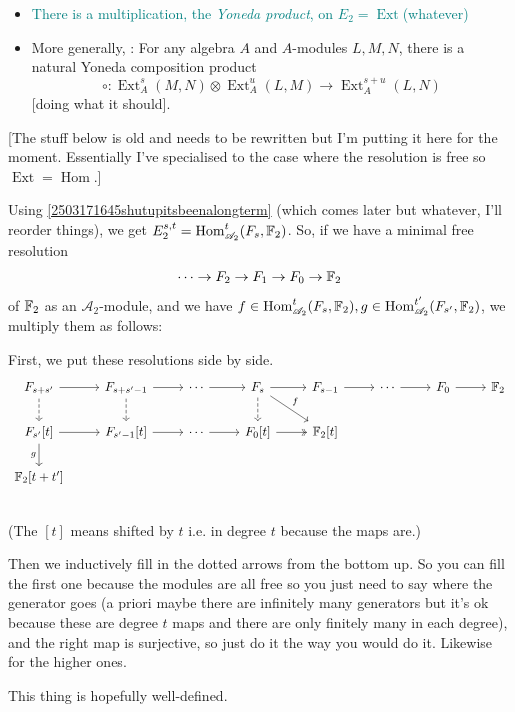 \documentclass{MetricNotes2023}
\def\bb{\ensuremath\mathbb}
\def\A{\ensuremath{\mathscr{A}_2}}
\DeclareMathOperator{\Ext}{Ext}
\DeclareMathOperator{\Hom}{Hom}
\def\textcolour{\textcolor}
\begin{document}
\begin{itemize}
\item \textcolour{teal}{There is a multiplication, the \textit{Yoneda product}, on \(E_2 = \Ext\)(whatever)}
\item More generally, \autocite{rognes2}: For any algebra \(A\) and \(A\)-modules \(L,M,N\), there is a natural Yoneda composition product
\[\circ : \Ext_A^s(M,N)\otimes \Ext^u_A(L,M)\to \Ext_A^{s+u}(L,N)\]
[doing what it should].
\end{itemize}

[The stuff below is old and needs to be rewritten but I'm putting it here for the moment. Essentially I've specialised to the case  where the resolution is free so \(\Ext=\Hom\).]

Using \ref{2503171645shutupitsbeenalongterm} (which comes later but whatever, I'll reorder things), we get \(E_2^{s,t}=\Hom^t_{\A}(F_s, \bb{F}_2)\). So, if we have a minimal free resolution 
\[\cdots \to F_2 \to F_1 \to F_0 \to \bb{F}_2\]
of \(\bb{F}_2\) as an \(\A\)-module, and we have \(f \in \Hom^t_{\A}(F_s, \bb{F}_2), g \in \Hom^{t'}_{\A}(F_{s'}, \bb{F}_2)\), we multiply them as follows:

First, we put these resolutions side by side.
\[\begin{tikzcd} 
F_{s+s'} \arrow[r, ""] \arrow[d, swap, "", dashrightarrow]  & F_{s+s'-1} \arrow[r, ""] \arrow[d, ""', dashrightarrow] & \cdots \arrow[r, ""] & F_s \arrow[d, ""', dashrightarrow] \arrow[dr, "f"] \arrow[r, ""] & F_{s-1} \arrow[r, ""'] & \cdots \arrow[r] & F_0 \arrow[r] & \bb{F}_2 \\ 
F_{s'}[t] \arrow[r, swap, ""] \arrow[d, swap, "g"] & F_{s'-1}[t] \arrow[r, ""'] & \cdots \arrow[r, ""'] & F_0[t] \arrow[r, ""', twoheadrightarrow] & \bb{F}_2[t] & & & \\ 
\bb{F}_2[t+t'] & & & & & & & \\ 
 \end{tikzcd}\] 
(The \([t]\) means shifted by \(t\) i.e. in degree \(t\) because the maps are.)

Then we inductively fill in the dotted arrows from the bottom up. So you can fill the first one because the modules are all free so you just need to say where the generator goes (a priori maybe there are infinitely many generators but it's ok because these are degree \(t\) maps and there are only finitely many in each degree), and the right map is surjective, so just do it the way you would do it. Likewise for the higher ones. 

This thing is hopefully well-defined.
\end{document}
